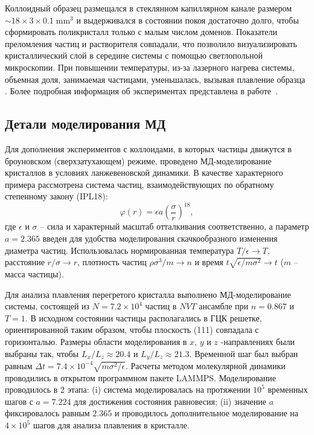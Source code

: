 Коллоидный образец размещался в стеклянном капиллярном канале размером $\sim 18 \times 3 \times 0.1 \; \mathrm{mm ^ 3} $ и выдерживался в состоянии покоя достаточно долго, чтобы сформировать поликристалл только с малым числом доменов.
Показатели преломления частиц и растворителя совпадали, что позволило визуализировать кристаллический слой в середине системы с помощью светлопольной микроскопии.
При повышении температуры, из-за лазерного нагрева системы, объемная доля, занимаемая частицами, уменьшалась, вызывая плавление образца \cite{10.1126/science.1112399}.
Более подробная информация об экспериментах представлена в работе~\cite{10.1126/science.1224763}.

\subsection{Детали моделирования МД}
\label{SSMF-AppC}

Для дополнения экспериментов с коллоидами, в которых частицы движутся в броуновском (сверхзатухающем) режиме, проведено МД-моделирование кристаллов в условиях ланжевеновской динамики.
В качестве характерного примера рассмотрена система частиц, взаимодействующих по обратному степенному закону (IPL18):
\begin{equation}
\label{SSMF-eq3}
\varphi(r) = \epsilon a \left(\frac{\sigma}{r}\right)^{18},
\end{equation}
где $\epsilon$ и $\sigma$ -- сила и характерный масштаб отталкивания соответственно,
а параметр $ a = 2.365 $ введен для удобства моделирования скачкообразного изменения диаметра частиц.
Использовалась нормированная температура $ T/ \epsilon \rightarrow T $, расстояние $ r/ \sigma \rightarrow r $, плотность частиц $\rho\sigma^3/m\rightarrow n$ и время $t\sqrt{\epsilon/m\sigma^2} \rightarrow t$ ($m$ -- масса частицы).

Для анализа плавления перегретого кристалла выполнено МД-моделирование системы, состоящей из $ N = 7.2 \times 10 ^ 4 $ частиц в $NVT$ ансамбле при $n=0.867$ и $T=1$.
В исходном состоянии частицы располагались в ГЦК решетке, ориентированной таким образом, чтобы плоскость (111) совпадала с горизонталью.
Размеры области моделирования в $ x $, $ y $ и $ z $ -направлениях были выбраны так, чтобы $ L_x / L_z \approx 20.4 $ и $ L_y / L_z \approx 21.3 $.
Временной шаг был выбран равным $ \Delta t = 7.4 \times 10 ^ {- 4} \sqrt {m \sigma ^ 2 / \epsilon} $. Расчеты методом молекулярной динамики проводились в открытом программном пакете LAMMPS.
Моделирование проводилось в 2 этапа: (i) система моделировалась на протяжении $ 10 ^ 5 $ временных шагов с $ a = 7.224 $ для достижения состояния равновесия; (ii) значение $a$ фиксировалось равным $ 2.365 $ и проводилось дополнительное моделирование на $ 4 \times 10 ^ 5 $ шагов для анализа плавления в кристалле.

